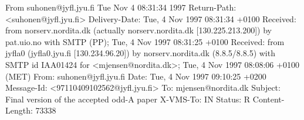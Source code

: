 From suhonen@jyfl.jyu.fi Tue Nov  4 08:31:34 1997
Return-Path: <suhonen@jyfl.jyu.fi>
Delivery-Date: Tue, 4 Nov 1997 08:31:34 +0100
Received: from norserv.nordita.dk (actually norserv.nordita.dk [130.225.213.200]) 
          by pat.uio.no with SMTP (PP); Tue, 4 Nov 1997 08:31:25 +0100
Received: from jyfla0 (jyfla0.jyu.fi [130.234.96.20]) 
          by norserv.nordita.dk (8.8.5/8.8.5) with SMTP id IAA01424 
          for <mjensen@nordita.dk>; Tue, 4 Nov 1997 08:08:06 +0100 (MET)
From: suhonen@jyfl.jyu.fi
Date: Tue, 4 Nov 1997 09:10:25 +0200
Message-Id: <97110409102562@jyfl.jyu.fi>
To: mjensen@nordita.dk
Subject: Final version of the accepted odd-A paper
X-VMS-To: IN%
Status: R
Content-Length: 73338

%
%
%
%
%
%
%



